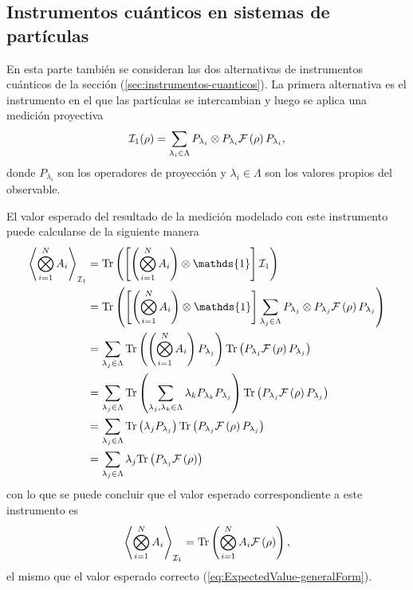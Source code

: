 \subsection{Instrumentos cuánticos en sistemas de \texorpdfstring{}{N} partículas}
En esta parte también se consideran las dos alternativas de instrumentos cuánticos de la sección ({\ref{sec:instrumentos-cuanticos}}). La primera alternativa es el instrumento en el que las partículas se intercambian y luego se aplica una medición proyectiva \begin{equation}\label{eq:1instrumentnp}
    \mathcal{I}_1(\rho)=\sum_{\lambda_i \in \Lambda }P_{\lambda_i}\otimes P_{\lambda_i}\mathcal{F}\left(\rho\right)P_{\lambda_i},
\end{equation} donde $P_{\lambda_i}$ son los operadores de proyección y $\lambda_i \in \Lambda$ son los valores propios del observable.  


El valor esperado del resultado de la medición modelado con este instrumento puede calcularse de la siguiente manera \begin{equation*}
    \begin{split}
        \left \la \prodtensor A_i \right \ra_{\mathcal{I}_1}&=\tr\left( \left[\left(\prodtensor A_i\right) \otimes \mathds{1}\right]\mathcal{I}_1\right) \\
        &=\tr\left(\left[ \left(\prodtensor A_i\right)\otimes \mathds{1}\right]\sum_{\lambda_j \in \Lambda}P_{\lambda_j}\otimes P_{\lambda_j}\fuzzy{\rho}P_{\lambda_j} \right)\\
        &=\sum_{\lambda_j\in \Lambda} \tr\left(\left(\prodtensor A_i\right) P_{\lambda_j}\right) \tr\left(P_{\lambda_j}\fuzzy{\rho} P_{\lambda_j}\right) \\
        &=\sum_{\lambda_j\in \Lambda} \tr\left(\sum_{{\lambda_j, \lambda_k \in \Lambda}}\lambda_k P_{\lambda_k} P_{\lambda_j}\right) \tr\left(P_{\lambda_j}\fuzzy{\rho} P_{\lambda_j}\right)  \\
        &=\sum_{\lambda_j \in\Lambda} \tr\left(\lambda_j P_{\lambda_j}\right) \tr\left(P_{\lambda_j}\fuzzy{\rho}P_{\lambda_j}\right) \\
        &=\sum_{\lambda_j \in \Lambda} \lambda_j \tr\left(P_{\lambda_j}\fuzzy{\rho}\right) \\
    \end{split}
\end{equation*} con lo que se puede concluir que el valor esperado correspondiente a este instrumento es \begin{equation}\label{eq:valor-esperado-1instrumentnp}
        \left \langle \bigotimes_{i=1}^{N} A_i \right \rangle_{\mathcal{I}_1}= {\rm Tr}\left( \bigotimes_{i=1}^{N} A_i \mathcal{F}\left(\rho\right)\right),
\end{equation}el mismo que el valor esperado correcto ({\ref{eq:ExpectedValue-generalForm}}).

